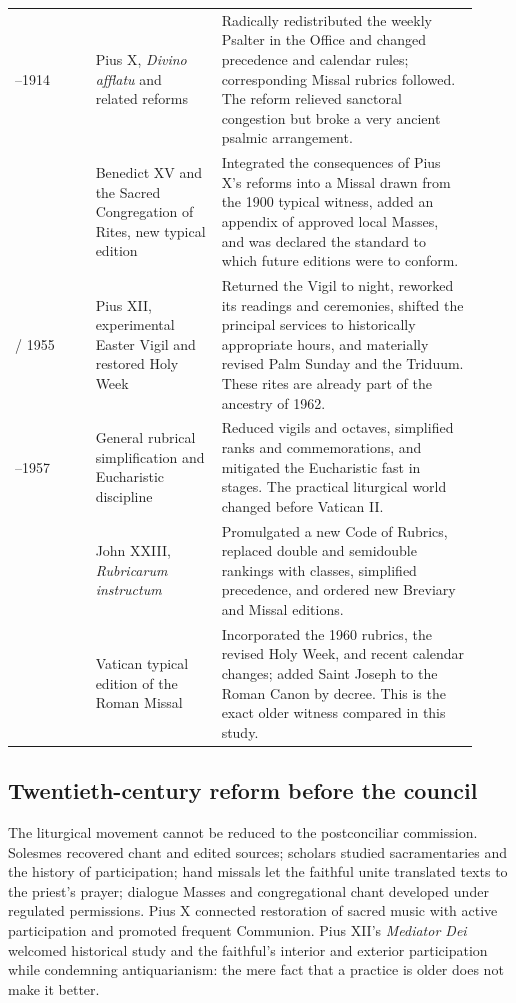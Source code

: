 \begin{longtable}{>{\bfseries\raggedright\arraybackslash}p{0.16\linewidth}>{\raggedright\arraybackslash}p{0.25\linewidth}>{\raggedright\arraybackslash}p{0.51\linewidth}}
1911--1914 & Pius X, \emph{Divino afflatu} and related reforms & Radically redistributed the weekly Psalter in the Office and changed precedence and calendar rules; corresponding Missal rubrics followed. The reform relieved sanctoral congestion but broke a very ancient psalmic arrangement.\\
1920 & Benedict XV and the Sacred Congregation of Rites, new typical edition & Integrated the consequences of Pius X's reforms into a Missal drawn from the 1900 typical witness, added an appendix of approved local Masses, and was declared the standard to which future editions were to conform.\\
1951 / 1955 & Pius XII, experimental Easter Vigil and restored Holy Week & Returned the Vigil to night, reworked its readings and ceremonies, shifted the principal services to historically appropriate hours, and materially revised Palm Sunday and the Triduum. These rites are already part of the ancestry of 1962.\\
1955--1957 & General rubrical simplification and Eucharistic discipline & Reduced vigils and octaves, simplified ranks and commemorations, and mitigated the Eucharistic fast in stages. The practical liturgical world changed before Vatican II.\\
1960 & John XXIII, \emph{Rubricarum instructum} & Promulgated a new Code of Rubrics, replaced double and semidouble rankings with classes, simplified precedence, and ordered new Breviary and Missal editions.\\
1962 & Vatican typical edition of the Roman Missal & Incorporated the 1960 rubrics, the revised Holy Week, and recent calendar changes; added Saint Joseph to the Roman Canon by decree. This is the exact older witness compared in this study.\\
\bottomrule
\end{longtable}

\subsection{Twentieth-century reform before the council}

The liturgical movement cannot be reduced to the postconciliar commission. Solesmes recovered chant and edited sources; scholars studied sacramentaries and the history of participation; hand missals let the faithful unite translated texts to the priest's prayer; dialogue Masses and congregational chant developed under regulated permissions. Pius X connected restoration of sacred music with active participation and promoted frequent Communion. Pius XII's \emph{Mediator Dei} welcomed historical study and the faithful's interior and exterior participation while condemning antiquarianism: the mere fact that a practice is older does not make it better.

